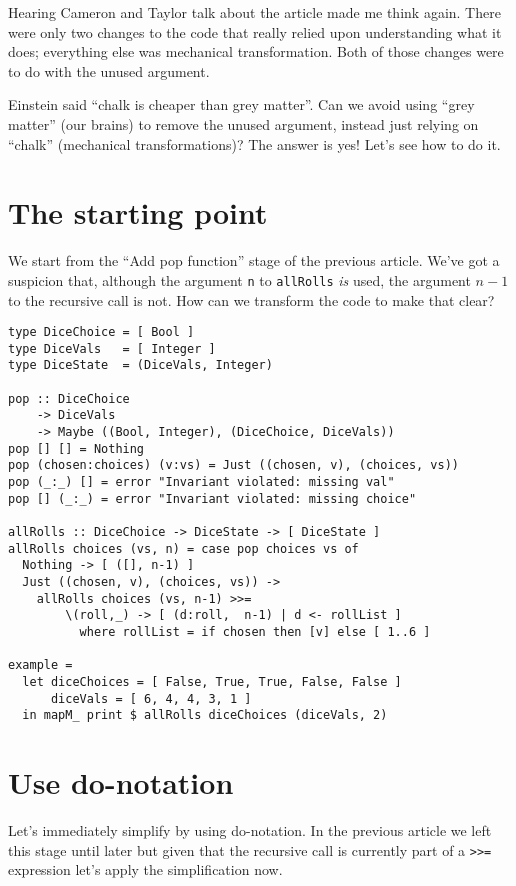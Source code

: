 Hearing Cameron and Taylor talk about the article made me think again. There were only two changes to the code that really relied upon understanding what it does; everything else was mechanical transformation. Both of those changes were to do with the unused argument.

Einstein said ``chalk is cheaper than grey matter''. Can we avoid using ``grey matter'' (our brains) to remove the unused argument, instead just relying on ``chalk'' (mechanical transformations)? The answer is yes! Let's see how to do it.

\section{The starting point}


We start from the ``Add pop function'' stage of the previous article. We've got a suspicion that, although the argument \texttt{n} to \texttt{allRolls} \textit{is} used, the argument $n-1$ to the recursive call is not. How can we transform the code to make that clear?

\begin{verbatim}
type DiceChoice = [ Bool ]
type DiceVals   = [ Integer ]
type DiceState  = (DiceVals, Integer)

pop :: DiceChoice
    -> DiceVals
    -> Maybe ((Bool, Integer), (DiceChoice, DiceVals))
pop [] [] = Nothing
pop (chosen:choices) (v:vs) = Just ((chosen, v), (choices, vs))
pop (_:_) [] = error "Invariant violated: missing val"
pop [] (_:_) = error "Invariant violated: missing choice"

allRolls :: DiceChoice -> DiceState -> [ DiceState ]
allRolls choices (vs, n) = case pop choices vs of
  Nothing -> [ ([], n-1) ]
  Just ((chosen, v), (choices, vs)) ->
    allRolls choices (vs, n-1) >>=
        \(roll,_) -> [ (d:roll,  n-1) | d <- rollList ]
          where rollList = if chosen then [v] else [ 1..6 ]

example =
  let diceChoices = [ False, True, True, False, False ]
      diceVals = [ 6, 4, 4, 3, 1 ]
  in mapM_ print $ allRolls diceChoices (diceVals, 2)
\end{verbatim}

\section{Use do-notation}


Let's immediately simplify by using do-notation. In the previous article we left this stage until later but given that the recursive call is currently part of a \texttt{>>=} expression let's apply the simplification now.

